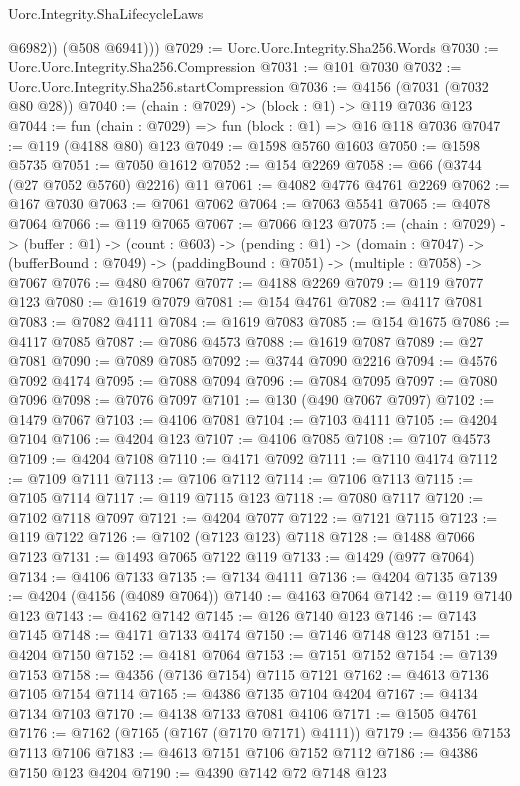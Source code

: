 \begin{lexlean}{Uorc.Integrity.ShaLifecycleLaws}
\begin{coremodule}
            @6982))
        (@508 @6941)))
@7029 := Uorc.Uorc.Integrity.Sha256.Words
@7030 := Uorc.Uorc.Integrity.Sha256.Compression
@7031 := @101 @7030
@7032 := Uorc.Uorc.Integrity.Sha256.startCompression
@7036 := @4156 (@7031 (@7032 @80 @28))
@7040 := (chain : @7029) -> (block : @1) -> @119 @7036 @123
@7044 := fun (chain : @7029) => fun (block : @1) => @16 @118 @7036
@7047 := @119 (@4188 @80) @123
@7049 := @1598 @5760 @1603
@7050 := @1598 @5735
@7051 := @7050 @1612
@7052 := @154 @2269
@7058 := @66 (@3744 (@27 @7052 @5760) @2216) @11
@7061 := @4082 @4776 @4761 @2269
@7062 := @167 @7030
@7063 := @7061 @7062
@7064 := @7063 @5541
@7065 := @4078 @7064
@7066 := @119 @7065
@7067 := @7066 @123
@7075 := (chain : @7029) ->
  (buffer : @1) ->
  (count : @603) ->
  (pending : @1) ->
  (domain : @7047) -> (bufferBound : @7049) -> (paddingBound : @7051) -> (multiple : @7058) -> @7067
@7076 := @480 @7067
@7077 := @4188 @2269
@7079 := @119 @7077 @123
@7080 := @1619 @7079
@7081 := @154 @4761
@7082 := @4117 @7081
@7083 := @7082 @4111
@7084 := @1619 @7083
@7085 := @154 @1675
@7086 := @4117 @7085
@7087 := @7086 @4573
@7088 := @1619 @7087
@7089 := @27 @7081
@7090 := @7089 @7085
@7092 := @3744 @7090 @2216
@7094 := @4576 @7092 @4174
@7095 := @7088 @7094
@7096 := @7084 @7095
@7097 := @7080 @7096
@7098 := @7076 @7097
@7101 := @130 (@490 @7067 @7097)
@7102 := @1479 @7067
@7103 := @4106 @7081
@7104 := @7103 @4111
@7105 := @4204 @7104
@7106 := @4204 @123
@7107 := @4106 @7085
@7108 := @7107 @4573
@7109 := @4204 @7108
@7110 := @4171 @7092
@7111 := @7110 @4174
@7112 := @7109 @7111
@7113 := @7106 @7112
@7114 := @7106 @7113
@7115 := @7105 @7114
@7117 := @119 @7115 @123
@7118 := @7080 @7117
@7120 := @7102 @7118 @7097
@7121 := @4204 @7077
@7122 := @7121 @7115
@7123 := @119 @7122
@7126 := @7102 (@7123 @123) @7118
@7128 := @1488 @7066 @7123
@7131 := @1493 @7065 @7122 @119
@7133 := @1429 (@977 @7064)
@7134 := @4106 @7133
@7135 := @7134 @4111
@7136 := @4204 @7135
@7139 := @4204 (@4156 (@4089 @7064))
@7140 := @4163 @7064
@7142 := @119 @7140 @123
@7143 := @4162 @7142
@7145 := @126 @7140 @123
@7146 := @7143 @7145
@7148 := @4171 @7133 @4174
@7150 := @7146 @7148 @123
@7151 := @4204 @7150
@7152 := @4181 @7064
@7153 := @7151 @7152
@7154 := @7139 @7153
@7158 := @4356 (@7136 @7154) @7115 @7121
@7162 := @4613 @7136 @7105 @7154 @7114
@7165 := @4386 @7135 @7104 @4204
@7167 := @4134 @7134 @7103
@7170 := @4138 @7133 @7081 @4106
@7171 := @1505 @4761
@7176 := @7162 (@7165 (@7167 (@7170 @7171) @4111))
@7179 := @4356 @7153 @7113 @7106
@7183 := @4613 @7151 @7106 @7152 @7112
@7186 := @4386 @7150 @123 @4204
@7190 := @4390 @7142 @72 @7148 @123

\end{coremodule}
\end{lexlean}
